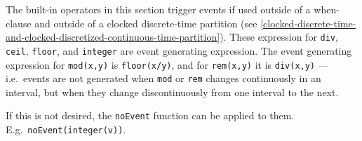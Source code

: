 The built-in operators in this section trigger events if used outside of
a when-clause and outside of a clocked discrete-time partition (see
\cref{clocked-discrete-time-and-clocked-discretized-continuous-time-partition}).
These expression for \lstinline!div!, \lstinline!ceil!, \lstinline!floor!, and \lstinline!integer! are
event generating expression. The event generating expression for
\lstinline!mod(x,y)! is \lstinline!floor(x/y)!, and for \lstinline!rem(x,y)! it is \lstinline!div(x,y)! --- i.e.\ events
are not generated when \lstinline!mod! or \lstinline!rem! changes continuously in an interval,
but when they change discontinuously from one interval to the next.

\begin{nonnormative}
If this is not desired, the \lstinline!noEvent! function can be applied to them.  E.g.\ \lstinline!noEvent(integer(v))!.
\end{nonnormative}

